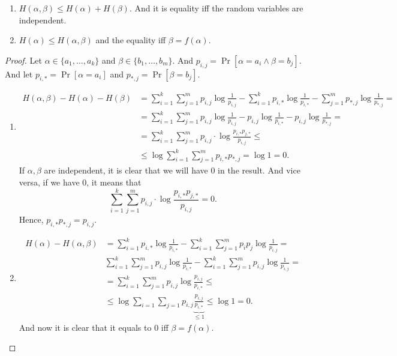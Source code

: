 \begin{lemma}
    \begin{enumerate}
        \item $H(\alpha, \beta) \leq H(\alpha) + H(\beta)$. And it is equality iff the random variables are independent.
        \item $ H(\alpha) \leq H(\alpha, \beta)$ and the equality iff $\beta =f(\alpha)$.
    \end{enumerate}
\end{lemma}
\begin{proof}
    Let $\alpha \in \{a_1, \ldots, a_k\}$ and $\beta \in \{b_1, \ldots, b_m\}$.
    And $p_{i, j} = \Pr[\alpha = a_i \land \beta = b_j]$.
    And let $p_{i,*} = \Pr[\alpha = a_i]$ and $p_{*, j} = \Pr[\beta = b_j]$.
    \begin{enumerate}
        \item
        \begin{align*}
            H(\alpha, \beta) - H(\alpha) - H(\beta) &= \sum_{i = 1}^{k} \sum_{j = 1}^{m} p_{i, j} \log \frac{1}{p_{i, j}} - \sum_{i = 1}^{k} p_{i,*} \log \frac{1}{p_{i,*}} - \sum_{j = 1}^m p_{*, j} \log \frac{1}{p_{*, j}} = \\
            &= \sum_{i = 1}^{k} \sum_{j = 1}^{m} p_{i, j} \log \frac{1}{p_{i, j}} - p_{i,j} \log \frac{1}{p_{i,*}} - p_{i, j} \log \frac{1}{p_{*, j}} = \\
            &= \sum_{i = 1}^k \sum_{j = 1}^m p_{i, j} \cdot \log \frac{p_{i,*} p_{j,*}}{p_{i, j}} \leq \\
            &\leq \log \sum_{i = 1}^k \sum_{j = 1}^m p_{i,*} p_{*,j} = \log 1 = 0.
        \end{align*}
        If $\alpha, \beta$ are independent, it is clear that we will have $0$ in the result.
        And vice versa, if we have $0$, it means that
        \[
            \sum_{i = 1}^k \sum_{j = 1}^m p_{i, j} \cdot \log \frac{p_{i,*} p_{j,*}}{p_{i, j}} = 0.
        \]
        Hence, $p_{i, *} p_{*, j} = p_{i, j}$.

        \item
        \begin{align*}
            H(\alpha) - H(\alpha, \beta) &= \sum_{i = 1}^k p_{i, *} \log \frac{1}{p_{i, *}} - \sum_{i = 1}^{k} \sum_{j = 1}^{m} p_i p_j \log \frac{1}{p_{i, j}} = \\
            & \sum_{i = 1}^k \sum_{j = 1}^m p_{i, j} \log \frac{1}{p_{i, *}} - \sum_{i = 1}^{k} \sum_{j = 1}^{m} p_{i, j} \log \frac{1}{p_{i, j}} = \\
            &= \sum_{i = 1}^k \sum_{j = 1}^m p_{i, j} \log \frac{p_{i, j}}{p_{i, *}} \leq \\
            &\leq \log \sum_{i = 1} \sum_{j = 1} p_{i, j} \underbrace{\frac{p_{i, j}}{p_{i, *}}}_{\leq 1} \leq \log 1 = 0.
        \end{align*}
        And now it is clear that it equals to $0$ iff $\beta = f(\alpha)$.
    \end{enumerate}
\end{proof}

